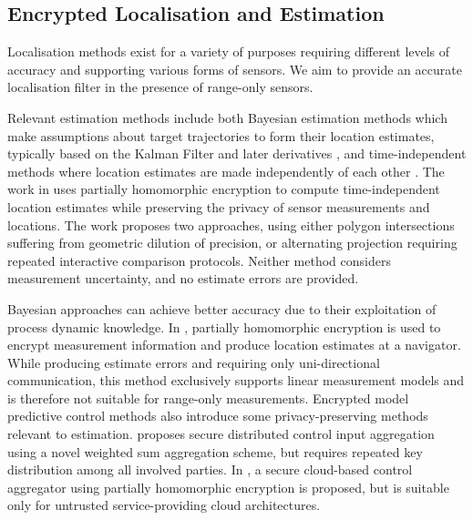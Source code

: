 \documentclass[twocolumn]{autart}
\begin{document}
% 
% 

\subsection{Encrypted Localisation and Estimation}
Localisation methods exist for a variety of purposes requiring different levels of accuracy and supporting various forms of sensors. We aim to provide an accurate localisation filter in the presence of range-only sensors. 

Relevant estimation methods include both Bayesian estimation methods which make assumptions about target trajectories to form their location estimates, typically based on the Kalman Filter and later derivatives \cite{kalmanNewApproachLinear1960,mutambaraDecentralizedEstimationControl1998}, and time-independent methods where location estimates are made independently of each other \cite{alanwarPrOLocResilientLocalization2017,lazosSeRLocSecureRangeindependent2004}. The work in \cite{alanwarPrOLocResilientLocalization2017} uses partially homomorphic encryption to compute time-independent location estimates while preserving the privacy of sensor measurements and locations. The work proposes two approaches, using either polygon intersections suffering from geometric dilution of precision, or alternating projection requiring repeated interactive comparison protocols. Neither method considers measurement uncertainty, and no estimate errors are provided. 

Bayesian approaches can achieve better accuracy due to their exploitation of process dynamic knowledge. In \cite{aristovEncryptedMultisensorInformation2018}, partially homomorphic encryption is used to encrypt measurement information and produce location estimates at a navigator. While producing estimate errors and requiring only uni-directional communication, this method exclusively supports linear measurement models and is therefore not suitable for range-only measurements. Encrypted model predictive control methods \cite{farokhiPrivacyDynamicalSystems2020} also introduce some privacy-preserving methods relevant to estimation. \cite{alexandruEncryptedCooperativeControl2019} proposes secure distributed control input aggregation using a novel weighted sum aggregation scheme, but requires repeated key distribution among all involved parties. In \cite{farokhiSecurePrivateControl2017}, a secure cloud-based control aggregator using partially homomorphic encryption is proposed, but is suitable only for untrusted service-providing cloud architectures.
\end{document}
